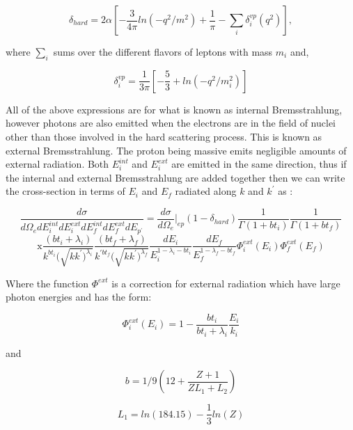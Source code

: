 \begin{equation}
\delta_{hard} = 2\alpha [ - \frac{3}{4\pi} ln( -q^{2}/m^{2}) + \frac{1}{\pi} - \sum_{i}\delta_{i}^{vp}(q^{2})],
\end{equation}

where $ \sum_{i}$ sums over the different flavors of leptons with mass $m_{i}$ and,

\begin{equation}
\delta_{i}^{vp} = \frac{1}{3\pi}[ - \frac{5}{3} + ln(-q^{2}/m^{2}_{i})] 
\end{equation}

All of the above expressions are for what is known as internal Bremsstrahlung, however
photons are also emitted when the electrons are in the field of nuclei other than those involved in the hard scattering process. This is known as external
Bremsstrahlung. The proton being massive emits negligible amounts of external
radiation. Both $E_{i}^{int}$ and $E_{i}^{ext}$ are emitted in the same direction, thus if the internal and external Bremsstrahlung are added together then we can write the cross-section in terms of $E_{i}$ and $E_{f}$ radiated along $k$ and $k^{'}$ as :

$$
\frac{d\sigma}{d\Omega_{e}dE_{i}^{int}dE_{i}^{ext}dE_{f}^{int}dE_{f}^{ext}dE_{p^{'}}} = \frac{d\sigma}{d\Omega_{e}}\vert_{ep}(1-\delta_{hard})\frac{1}{\Gamma(1+bt_{i})}\frac{1}{\Gamma(1+bt_{f})}
$$
\begin{equation}
\mbox{x}\frac{(bt_{i} + \lambda_{i})}{k^{bt_{i}}
(\sqrt{kk^{'})^{\lambda_{i}}}}\frac{(bt_{f} + \lambda_{f})}{k^{'bt_{f}}(\sqrt{kk^{'})^{\lambda_{f}}}}\frac{dE_{i}}{E_{i}^{1-\lambda_{i}-bt_{i}}}\frac{dE_{f}}
{E_{f}^{1-\lambda_{f}-bt_{f}}}\Phi_{i}^{ext}(E_{i})\Phi_{f}^{ext}(E_{f})
\end{equation}

Where the function $\Phi^{ext}$ is a correction for external radiation which have large photon energies and
has the form:

\begin{equation}
          \Phi^{ext}_{i}(E_{i}) = 1 - \frac{bt_{i}}{bt_{i}+ \lambda_{i}}\frac{E_{i}}{k_{i}}
\end{equation}

and

\begin{equation}
         b = 1/9(12 + \frac{ Z + 1}{ ZL_{1} + L_{2}})
\end{equation}

\begin{equation} 
        L_{1} = ln(184.15) - \frac{1}{3}ln(Z)
\end{equation}

